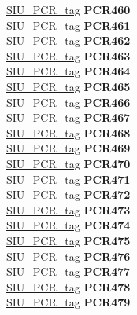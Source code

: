 \begin{DoxyCompactItemize}
\begin{tabbing}
\>\>\mbox{\hyperlink{unionSIU__tag_1_1SIU__PCR__tag}{SIU\_PCR\_tag}} {\bfseries PCR460}\\
\>\>\mbox{\hyperlink{unionSIU__tag_1_1SIU__PCR__tag}{SIU\_PCR\_tag}} {\bfseries PCR461}\\
\>\>\mbox{\hyperlink{unionSIU__tag_1_1SIU__PCR__tag}{SIU\_PCR\_tag}} {\bfseries PCR462}\\
\>\>\mbox{\hyperlink{unionSIU__tag_1_1SIU__PCR__tag}{SIU\_PCR\_tag}} {\bfseries PCR463}\\
\>\>\mbox{\hyperlink{unionSIU__tag_1_1SIU__PCR__tag}{SIU\_PCR\_tag}} {\bfseries PCR464}\\
\>\>\mbox{\hyperlink{unionSIU__tag_1_1SIU__PCR__tag}{SIU\_PCR\_tag}} {\bfseries PCR465}\\
\>\>\mbox{\hyperlink{unionSIU__tag_1_1SIU__PCR__tag}{SIU\_PCR\_tag}} {\bfseries PCR466}\\
\>\>\mbox{\hyperlink{unionSIU__tag_1_1SIU__PCR__tag}{SIU\_PCR\_tag}} {\bfseries PCR467}\\
\>\>\mbox{\hyperlink{unionSIU__tag_1_1SIU__PCR__tag}{SIU\_PCR\_tag}} {\bfseries PCR468}\\
\>\>\mbox{\hyperlink{unionSIU__tag_1_1SIU__PCR__tag}{SIU\_PCR\_tag}} {\bfseries PCR469}\\
\>\>\mbox{\hyperlink{unionSIU__tag_1_1SIU__PCR__tag}{SIU\_PCR\_tag}} {\bfseries PCR470}\\
\>\>\mbox{\hyperlink{unionSIU__tag_1_1SIU__PCR__tag}{SIU\_PCR\_tag}} {\bfseries PCR471}\\
\>\>\mbox{\hyperlink{unionSIU__tag_1_1SIU__PCR__tag}{SIU\_PCR\_tag}} {\bfseries PCR472}\\
\>\>\mbox{\hyperlink{unionSIU__tag_1_1SIU__PCR__tag}{SIU\_PCR\_tag}} {\bfseries PCR473}\\
\>\>\mbox{\hyperlink{unionSIU__tag_1_1SIU__PCR__tag}{SIU\_PCR\_tag}} {\bfseries PCR474}\\
\>\>\mbox{\hyperlink{unionSIU__tag_1_1SIU__PCR__tag}{SIU\_PCR\_tag}} {\bfseries PCR475}\\
\>\>\mbox{\hyperlink{unionSIU__tag_1_1SIU__PCR__tag}{SIU\_PCR\_tag}} {\bfseries PCR476}\\
\>\>\mbox{\hyperlink{unionSIU__tag_1_1SIU__PCR__tag}{SIU\_PCR\_tag}} {\bfseries PCR477}\\
\>\>\mbox{\hyperlink{unionSIU__tag_1_1SIU__PCR__tag}{SIU\_PCR\_tag}} {\bfseries PCR478}\\
\>\>\mbox{\hyperlink{unionSIU__tag_1_1SIU__PCR__tag}{SIU\_PCR\_tag}} {\bfseries PCR479}\\

\end{tabbing}
\end{DoxyCompactItemize}
